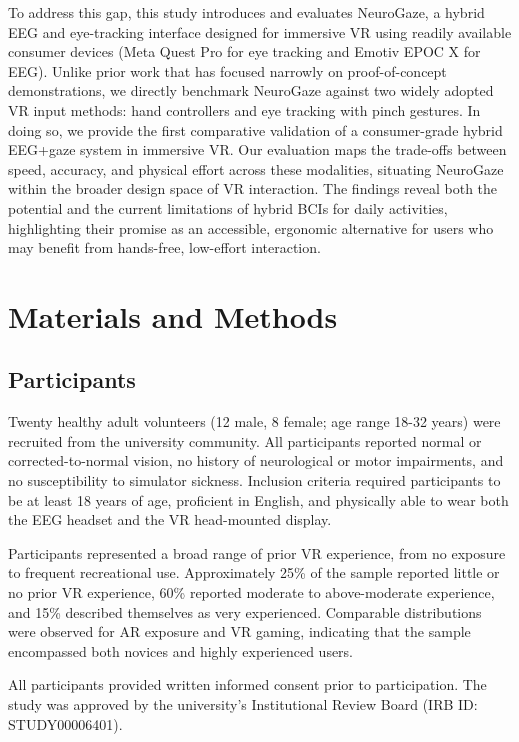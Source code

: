 \documentclass[utf8]{FrontiersinHarvard} %
\begin{document}
To address this gap, this study introduces and evaluates NeuroGaze, a hybrid EEG and eye-tracking interface designed for immersive VR using readily available consumer devices (Meta Quest Pro for eye tracking and Emotiv EPOC X for EEG). Unlike prior work that has focused narrowly on proof-of-concept demonstrations, we directly benchmark NeuroGaze against two widely adopted VR input methods: hand controllers and eye tracking with pinch gestures. In doing so, we provide the first comparative validation of a consumer-grade hybrid EEG+gaze system in immersive VR. Our evaluation maps the trade-offs between speed, accuracy, and physical effort across these modalities, situating NeuroGaze within the broader design space of VR interaction. The findings reveal both the potential and the current limitations of hybrid BCIs for daily activities, highlighting their promise as an accessible, ergonomic alternative for users who may benefit from hands-free, low-effort interaction.



\section{Materials and Methods}

\subsection{Participants}
Twenty healthy adult volunteers (12 male, 8 female; age range 18-32 years) were recruited from the university community. All participants reported normal or corrected-to-normal vision, no history of neurological or motor impairments, and no susceptibility to simulator sickness. Inclusion criteria required participants to be at least 18 years of age, proficient in English, and physically able to wear both the EEG headset and the VR head-mounted display.

Participants represented a broad range of prior VR experience, from no exposure to frequent recreational use. Approximately 25\% of the sample reported little or no prior VR experience, 60\% reported moderate to above-moderate experience, and 15\% described themselves as very experienced. Comparable distributions were observed for AR exposure and VR gaming, indicating that the sample encompassed both novices and highly experienced users. %

All participants provided written informed consent prior to participation. The study was approved by the university's Institutional Review Board (IRB ID: STUDY00006401).
\end{document}
